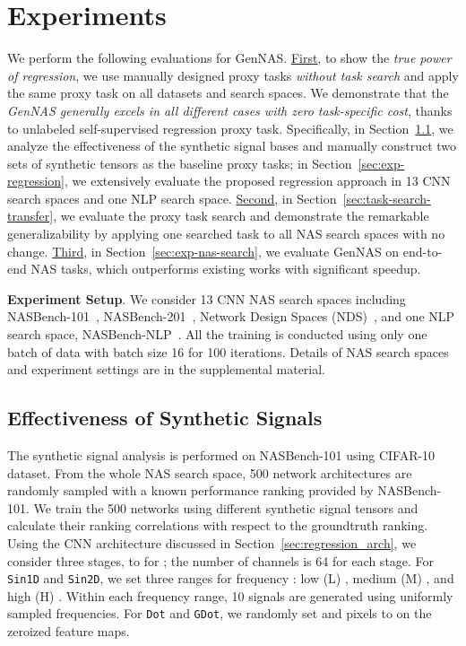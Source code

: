 \documentclass{article}
\begin{document}
\vspace{-8pt}
\section{Experiments~\label{sec:Experiment}}
\vspace{-6pt}

We perform the following evaluations for GenNAS.
\underline{First}, to show the \textit{true power of regression}, we use manually designed proxy tasks \textit{without task search} and apply the same proxy task on all datasets and search spaces. We demonstrate that the \textit{GenNAS generally excels in all different cases with zero task-specific cost}, thanks to unlabeled self-supervised regression proxy task.
Specifically, in Section~\ref{sec:ablation-signals}, we analyze the effectiveness of the synthetic signal bases and manually construct two sets of synthetic tensors as the baseline proxy tasks;
in Section~\ref{sec:exp-regression}, we extensively evaluate the proposed regression approach in 13 CNN search spaces and one NLP search space.
\underline{Second}, in Section~\ref{sec:task-search-transfer}, we evaluate the proxy task search and demonstrate the remarkable generalizability by applying one searched task to all NAS search spaces with no change.
\underline{Third}, in Section~\ref{sec:exp-nas-search}, we evaluate GenNAS on end-to-end NAS tasks, which outperforms existing works with significant speedup. 

\textbf{Experiment Setup}. We consider 13 CNN NAS search spaces including NASBench-101~\cite{ying2019bench}, NASBench-201~\cite{dong2020bench}, Network Design Spaces (NDS)~\cite{radosavovic2019network}, and one NLP search space, NASBench-NLP~\cite{klyuchnikov2020bench}. 
All the training is conducted using only one batch of data with batch size 16 for 100 iterations. Details of NAS search spaces and experiment settings are in the supplemental material.



\vspace{-5pt}
\subsection{Effectiveness of Synthetic Signals} 
\label{sec:ablation-signals}
\vspace{-4pt}

The synthetic signal analysis is performed on NASBench-101 using CIFAR-10 dataset.
From the whole NAS search space, 500 network architectures are randomly sampled with a known performance ranking provided by NASBench-101.
We train the 500 networks using different synthetic signal tensors and calculate their ranking correlations with respect to the groundtruth ranking.
Using the CNN architecture discussed in Section~\ref{sec:regression_arch}, we consider three stages,  to  for ; the number of channels is 64 for each stage.
For \texttt{Sin1D} and \texttt{Sin2D}, we set three ranges for frequency : low (L)  , medium (M) , and high (H) .
Within each frequency range, 10 signals are generated using uniformly sampled frequencies.
For \texttt{Dot} and \texttt{GDot}, we randomly set  and  pixels to  on the zeroized feature maps.
\end{document}
